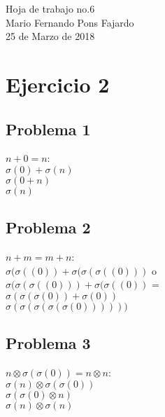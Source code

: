 \documentclass[10pt,a4paper]{article}
\begin{document}
\begin{center}
\huge {Hoja de trabajo no.6} \\
\large {Mario Fernando Pons Fajardo} \\
\large {25 de Marzo de 2018}

\end{center}

    \section{Ejercicio 2}       
    \subsection{Problema 1} 
      $n+0=n$:\\
            $\sigma(0) + \sigma(n)$\\
            $\sigma (0 + n)$\\
            $\sigma(n)$
    \subsection{Problema 2}
      $n+m = m+n$:\\
            $\sigma(\sigma((0)) + \sigma(\sigma(\sigma((0)))$ o \\
            $\sigma(\sigma(\sigma((0))) + \sigma(\sigma((0))$ =\\
            $\sigma (\sigma(\sigma(0)) + \sigma(0))$\\
            $\sigma(\sigma(\sigma(\sigma(\sigma(0))))))$
    \subsection{Problema 3}
       $n \otimes \sigma(\sigma(0)) = n \otimes n$:\\
            $\sigma(n) \otimes \sigma(\sigma(0))$\\
            $\sigma (\sigma(0) \otimes n)$\\
            $\sigma(n) \otimes \sigma(n)$
    
\end{document}
